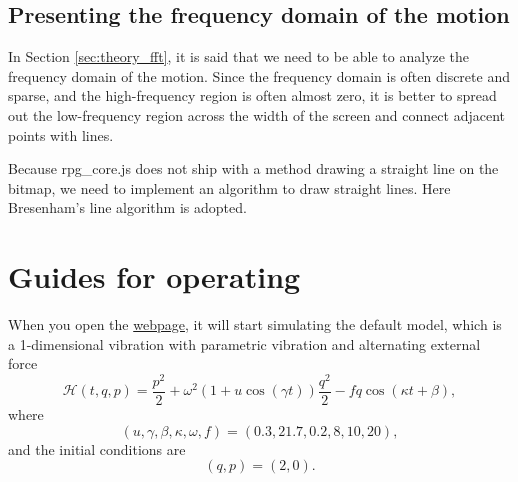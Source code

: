 \documentclass[12pt]{article}
\begin{document}
\subsection{Presenting the frequency domain of the motion}

In Section \ref{sec:theory_fft},
it is said that we need to be able to analyze the frequency domain of the motion.
Since the frequency domain is often discrete and sparse,
and the high-frequency region is often almost zero,
it is better to spread out the low-frequency region across the width of the screen
and connect adjacent points with lines.

Because rpg\_core.js does not ship with a method drawing a straight line on the bitmap,
we need to implement an algorithm to draw straight lines.
Here Bresenham's line algorithm \cite{gaol2013bresenham} is adopted.

\section{Guides for operating}
\label{sec:program}

When you open the \href{https://UlyssesZh.github.io/rpg/mechsimul2}{webpage},
it will start simulating the default model,
which is a 1-dimensional vibration with parametric vibration \cite[p. 82]{landau1976mechanics} and alternating external force \cite[p. 61]{landau1976mechanics}
\begin{equation}
  \mathcal H\!\left(t,q,p\right)=\frac{p^2}2+\omega^2\left(1+u\cos\!\left(\gamma t\right)\right)\frac{q^2}2-fq\cos\!\left(\kappa t+\beta\right),
\end{equation}
where
\begin{equation*}
  \left(u,\gamma,\beta,\kappa,\omega,f\right)=\left(0.3,21.7,0.2,8,10,20\right),
\end{equation*}
and the initial conditions are
\begin{equation*}
  \left(q,p\right)=\left(2,0\right).
\end{equation*}
\end{document}
